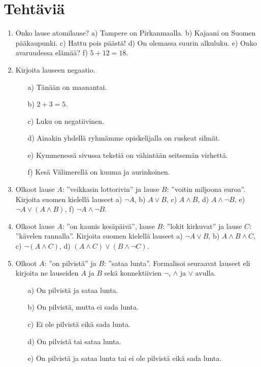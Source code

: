 \newpage

\section*{Tehtäviä}

\begin{enumerate}
\item Onko lause atomilause?
a) Tampere on Pirkanmaalla. b) Kajaani on Suomen pääkaupunki. c) Hattu pois päästä! d) On olemassa suurin alkuluku.
e) Onko avaruudessa elämää? f) $5 + 12 = 18$.

\item Kirjoita lauseen negaatio.
\begin{itemize}
\item[a)] Tänään on maanantai.
\item[b)] $2+3=5$.
\item[c)] Luku on negatiivinen.
\item[d)] Ainakin yhdellä ryhmämme opiskelijalla on ruskeat silmät.
\item[e)] Kymmenessä sivussa tekstiä on vähintään seitsemän virhettä.
\item[f)] Kesä Välimerellä on kuuma ja aurinkoinen.
\end{itemize}

\item Olkoot lause $A$: ''veikkasin lottorivin'' ja lause $B$: ''voitin miljoona euroa''. Kirjoita suomen kielellä lauseet
a) $\lnot A$, b) $A\lor B$, c) $A\land B$, d) $A\land \lnot B$,  
e) $\lnot A\lor (A\land B)$, f) $\lnot A\land \lnot B$.

\item
Olkoot lause $A$: ''on kaunis kesäpäivä'',  lause $B$: ''lokit kirkuvat'' ja lause $C$: ''kävelen rannalla''. Kirjoita suomen kielellä lauseet
a) $\lnot A\lor B$,
b) $A\land B \land C$, c)
$\lnot(A\land C)$,
d) $(A\land C)\lor (B\land
\lnot C)$.

\item Olkoot $A$: ''on pilvistä'' ja $B$: ''sataa
lunta''. Formalisoi seuraavat lauseet eli kirjoita ne
lauseiden $A$ ja $B$ sekä konnektiivien $\lnot$, $\land$
ja $\lor$ avulla.
\begin{itemize}
\item[a)] On pilvistä ja sataa lunta.
\item[b)] On pilvistä, mutta ei sada lunta.
\item[c)] Ei ole pilvistä eikä sada lunta.
\item[d)] On pilvistä tai sataa lunta.
\item[e)] On pilvistä ja sataa lunta tai ei ole pilvistä
eikä sada lunta.
\end{itemize}


\end{enumerate}

